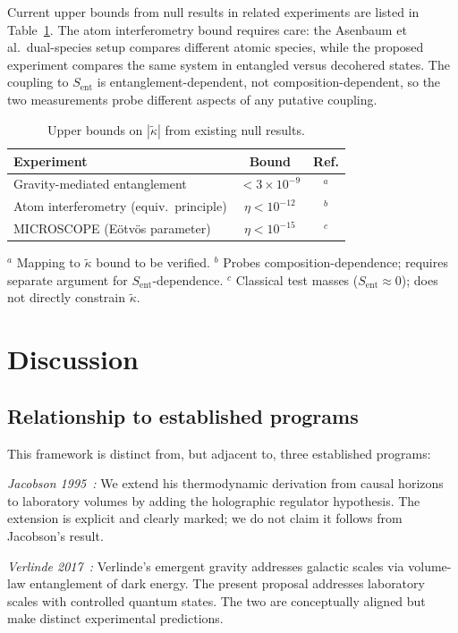 \documentclass[12pt,twocolumn]{article}
\newcommand{\kt}{\tilde{\kappa}}
\newcommand{\Sent}{S_{\mathrm{ent}}}
\begin{document}
Current upper bounds from null results in related experiments are listed in
Table~\ref{tab:bounds}.  The atom interferometry bound requires care: the Asenbaum et al.\
dual-species setup compares different atomic species, while the proposed experiment compares
the same system in entangled versus decohered states.  The coupling to $\Sent$ is
entanglement-dependent, not composition-dependent, so the two measurements probe different
aspects of any putative coupling.

\begin{table}[b]
\caption{Upper bounds on $|\kt|$ from existing null results.}
\label{tab:bounds}
\begin{tabular}{@{}p{5cm}cc@{}}
Experiment & Bound & Ref. \\
\hline
Gravity-mediated entanglement & $<3\times10^{-9}$ & \cite{Bose2017}$^a$ \\
Atom interferometry (equiv.\ principle) & $\eta<10^{-12}$ & \cite{Asenbaum2020}$^b$ \\
MICROSCOPE (Eötvös parameter) & $\eta<10^{-15}$ & \cite{MICROSCOPE2022}$^c$ \\
\end{tabular}
{\footnotesize
$^a$ Mapping to $\kt$ bound to be verified.
$^b$ Probes composition-dependence; requires separate argument for $\Sent$-dependence.
$^c$ Classical test masses ($\Sent\approx 0$); does not directly constrain $\kt$.}
\end{table}

\section{Discussion}
\label{sec:discussion}

\subsection{Relationship to established programs}

This framework is distinct from, but adjacent to, three established programs:

\textit{Jacobson 1995~\cite{Jacobson1995}:} We extend his thermodynamic derivation from
causal horizons to laboratory volumes by adding the holographic regulator hypothesis.  The
extension is explicit and clearly marked; we do not claim it follows from Jacobson's result.

\textit{Verlinde 2017~\cite{Verlinde2017}:} Verlinde's emergent gravity addresses galactic
scales via volume-law entanglement of dark energy.  The present proposal addresses laboratory
scales with controlled quantum states.  The two are conceptually aligned but make distinct
experimental predictions.
\end{document}
